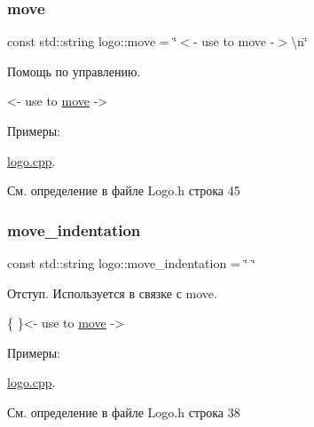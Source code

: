 \subsubsection{\texorpdfstring{move}{move}}
{\footnotesize\ttfamily const std\+::string logo\+::move = \char`\"{}$<$-\/ use to move -\/$>$\textbackslash{}n\char`\"{}}

Помощь по управлению. 
\begin{DoxyCode}
<- use to \hyperlink{namespacelogo_a03b6b80b5648e7dbbbf00b258df733b6}{move} ->
\end{DoxyCode}
 \begin{Desc}
\item[Примеры\+: ]\par
\hyperlink{logo_8cpp-example}{logo.\+cpp}.\end{Desc}


См. определение в файле Logo.\+h строка 45

\mbox{\label{namespacelogo_a7570bf74bf945a06ced26f6fccaeab53}} 
\subsubsection{\texorpdfstring{move\+\_\+indentation}{move\_indentation}}
{\footnotesize\ttfamily const std\+::string logo\+::move\+\_\+indentation = \char`\"{} \char`\"{}}

Отступ. Используется в связке с move. 
\begin{DoxyCode}
\{       \}<- use to \hyperlink{namespacelogo_a03b6b80b5648e7dbbbf00b258df733b6}{move} ->
\end{DoxyCode}
 \begin{Desc}
\item[Примеры\+: ]\par
\hyperlink{logo_8cpp-example}{logo.\+cpp}.\end{Desc}


См. определение в файле Logo.\+h строка 38

\mbox{\label{namespacelogo_abbbdbfbbcae50e2017f3ed1bdf0e1fa3}} 
